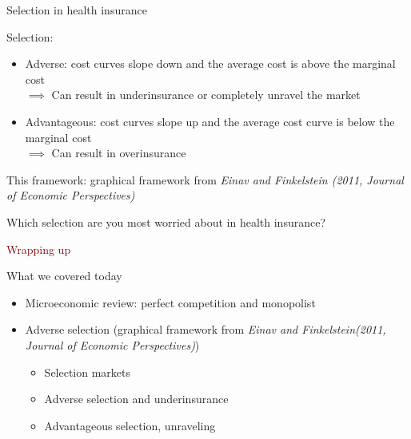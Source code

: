 \begin{frame}{Selection in health insurance}

    Selection:
    \begin{itemize}
        \item Adverse: cost curves slope down and the average cost is above the marginal cost\\
        $\implies$ Can result in underinsurance or completely unravel the market
        \item Advantageous: cost curves slope up and the average cost curve is below the marginal cost\\
        $\implies$ Can result in overinsurance
    \end{itemize}
    \vspace{5mm}

    This framework: graphical framework from \textit{Einav and Finkelstein (2011, Journal of Economic Perspectives)}\\
    \vspace{5mm}

    Which selection are you most worried about in health insurance?
\end{frame}
\begin{frame}{}
    \begin{center}
    \Large \textcolor{maroon}{Wrapping up}
    \end{center}
\end{frame}
\begin{frame}{What we covered today}
    \begin{itemize}
    \item Microeconomic review: perfect competition and monopolist
    \item Adverse selection {\footnotesize {\color{gray} (graphical framework from \textit{Einav and Finkelstein(2011, Journal of Economic Perspectives)})}}
    \begin{itemize}
        \item Selection markets
        \item Adverse selection and underinsurance
        \item Advantageous selection, unraveling
    \end{itemize}
\end{itemize}
\end{frame}
